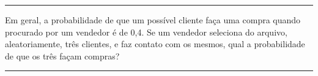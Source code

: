 \documentclass[a4paper,11pt,fleqn]{article}\usepackage[]{graphicx}\usepackage[]{color}
\theoremstyle{definition}
\begin{document}
\begin{compactenum}
\vspace{0.3cm}
\hrule
\vspace{0.3cm}

\item Em geral, a probabilidade de que um possível cliente faça uma
  compra quando procurado por um vendedor é de 0,4. Se um vendedor
  seleciona do arquivo, aleatoriamente, três clientes, e faz contato com
  os mesmos, qual a probabilidade de que os três façam compras?

\vspace{0.3cm}
\hrule
\vspace{0.3cm}

\end{compactenum}
\end{document}
